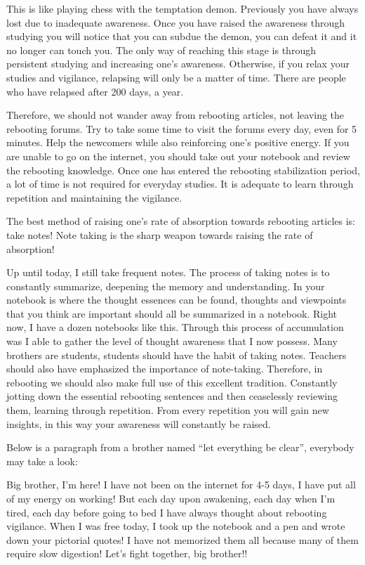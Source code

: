 \documentclass[
]{book}
\begin{document}
This is like playing chess with the temptation demon. Previously you have always lost due to inadequate awareness. Once you have raised the awareness through studying you will notice that you can subdue the demon, you can defeat it and it no longer can touch you. The only way of reaching this stage is through persistent studying and increasing one's awareness. Otherwise, if you relax your studies and vigilance, relapsing will only be a matter of time. There are people who have relapsed after 200 days, a year.

Therefore, we should not wander away from rebooting articles, not leaving the rebooting forums. Try to take some time to visit the forums every day, even for 5 minutes. Help the newcomers while also reinforcing one's positive energy. If you are unable to go on the internet, you should take out your notebook and review the rebooting knowledge. Once one has entered the rebooting stabilization period, a lot of time is not required for everyday studies. It is adequate to learn through repetition and maintaining the vigilance.

The best method of raising one's rate of absorption towards rebooting articles is: take notes! Note taking is the sharp weapon towards raising the rate of absorption!

Up until today, I still take frequent notes. The process of taking notes is to constantly summarize, deepening the memory and understanding. In your notebook is where the thought essences can be found, thoughts and viewpoints that you think are important should all be summarized in a notebook. Right now, I have a dozen notebooks like this. Through this process of accumulation was I able to gather the level of thought awareness that I now possess. Many brothers are students, students should have the habit of taking notes. Teachers should also have emphasized the importance of note-taking. Therefore, in rebooting we should also make full use of this excellent tradition. Constantly jotting down the essential rebooting sentences and then ceaselessly reviewing them, learning through repetition. From every repetition you will gain new insights, in this way your awareness will constantly be raised.

Below is a paragraph from a brother named ``let everything be clear'', everybody may take a look:

Big brother, I'm here! I have not been on the internet for 4-5 days, I have put all of my energy on working! But each day upon awakening, each day when I'm tired, each day before going to bed I have always thought about rebooting vigilance. When I was free today, I took up the notebook and a pen and wrote down your pictorial quotes! I have not memorized them all because many of them require slow digestion! Let's fight together, big brother!!
\end{document}
